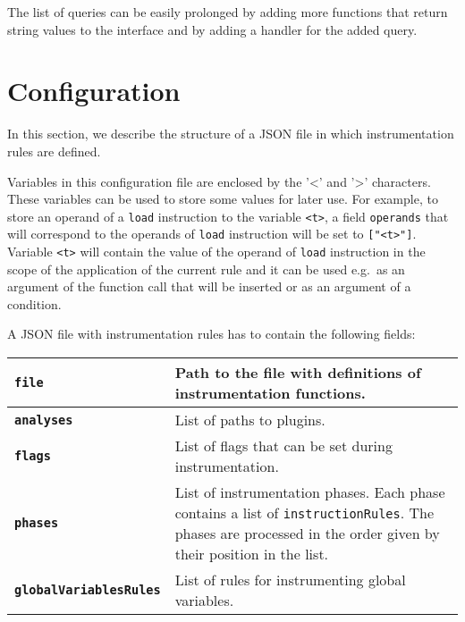 The list of queries can be easily prolonged by adding more functions that return
string values to the interface and by adding a handler for the added query.


\section{Configuration}\label{sec:config}

In this section, we describe the structure of a JSON file in which
instrumentation rules are defined.

Variables in this configuration file are enclosed by the '<' and '>'
characters. These variables can be used to store some values for later use. For
example, to store an operand of a \texttt{load} instruction to the variable
\texttt{<t>}, a field \texttt{operands} that will correspond to the operands of
\texttt{load} instruction will be set to \texttt{["<t>"]}.  Variable
\texttt{<t>} will contain the value of the operand of \texttt{load} instruction
in the scope of the application of the current rule and it can be used e.g.~as
an argument of the function call that will be inserted or as an argument
of a condition.

A JSON file with instrumentation rules has to contain the following fields:

\begin{center}
\begin{tabular}[h]{>{\bfseries}p{4.3cm} | p{7.7cm}}
  \texttt{file}                & Path to the file with definitions of instrumentation functions. \\
  \hline
  \texttt{analyses}            & List of paths to plugins. \\
  \hline
  \texttt{flags}               & List of flags that can be set during instrumentation. \\
  \hline \texttt{phases}              & List of instrumentation phases. Each
  phase contains a list of \texttt{instructionRules}. The phases are processed
  in the order given by their position in the list. \\
  \hline
  \texttt{globalVariablesRules} & List of rules for instrumenting global
                                 variables.

\end{tabular}
\end{center}

